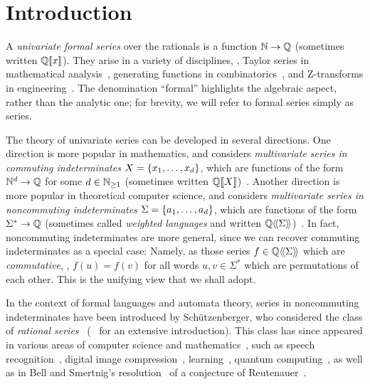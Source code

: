 \section{Introduction}
\label{sec:introduction}

A \emph{univariate formal series} over the rationals is a function $\mathbb N \to \mathbb Q$
(sometimes written $\mathbb Q[\![x]\!]$).
%
They arise in a variety of disciplines, \eg,
Taylor series in mathematical analysis~\cite{Rudin:Analysis:1976},
generating functions in combinatorics~\cite{Stanley:1986,Wilf:generatingfunctionology:2005},
and Z-transforms in engineering~\cite{OppenheimSchafer:DSP:1975}.
%
The denomination ``formal'' highlights the algebraic aspect, rather than the analytic one;
for brevity, we will refer to formal series simply as series.

The theory of univariate series can be developed in several directions.
%
One direction is more popular in mathematics,
and considers \emph{multivariate series in commuting indeterminates $X = \left\{x_1, \dots, x_d\right\}$},
which are functions of the form $\mathbb N^d \to \mathbb Q$ for some $d \in \mathbb N_{\geq 1}$
(sometimes written $\mathbb Q[\![X]\!]$)~\cite{PemantleWilsonMelczer:CUP:2024}.
%
Another direction is more popular in theoretical computer science,
and considers \emph{multivariate series in noncommuting indeterminates $\Sigma = \left\{a_1, \dots, a_d\right\}$},
which are functions of the form $\Sigma^* \to \mathbb Q$
(sometimes called \emph{weighted languages} and written $\mathbb Q\langle\!\langle\Sigma\rangle\!\rangle$)~\cite{BerstelReutenauer:CUP:2010}.
%
In fact, noncommuting indeterminates are more general,
since we can recover commuting indeterminates as a special case:
%
Namely, as those series $f \in \mathbb Q\langle\!\langle\Sigma\rangle\!\rangle$ which are \emph{commutative},
\ie, $f(u) = f(v)$ for all words $u, v \in \Sigma^*$ which are permutations of each other.
%
This is the unifying view that we shall adopt.

In the context of formal languages and automata theory,
series in noncommuting indeterminates have been introduced by Schützenberger,
who considered the class of \emph{rational series}~\cite{Schutzenberger:IC:1961}
(\cf~\cite{BerstelReutenauer:CUP:2010} for an extensive introduction).
%
This class has since appeared in various areas of computer science and mathematics~\cite{HandbookWA},
such as speech recognition~\cite{MohriPereira:Riley:CSL:2002},
digital image compression~\cite[Part IV]{HandbookWA},
learning~\cite{BalleMohri:AI:2015},
quantum computing~\cite{BlondelJeandelKoiranPortier:SIAM:JoC:2005},
as well as in Bell and Smertnig's resolution~\cite{BellSmertnig:SM:2021}
of a conjecture of Reutenauer~\cite{Reutenauer:FCT:1979}.

